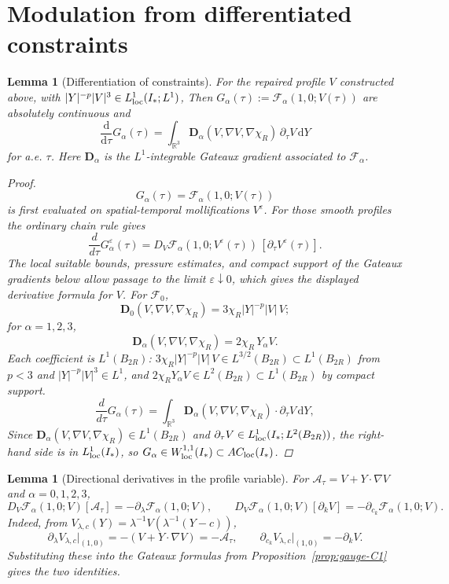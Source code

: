 \documentclass[11pt]{amsart}
\theoremstyle{plain}
\newtheorem{lemma}[theorem]{Lemma}
\theoremstyle{definition}
\theoremstyle{remark}
\newcommand{\dd}{\mathrm d}
\newcommand{\RR}{\mathbb R}
\newcommand{\nn}{\nabla}
\begin{document}
\section{Modulation from differentiated constraints}\label{sec:modulation}
\begin{lemma}[Differentiation of constraints]\label{lem:diff-f}
For the repaired profile \(V\) constructed above, with
\(|Y|^{-p}|V|^3\in L^1_{\rm loc}(I_*;L^1)\),
Then \(G_\alpha(\tau):=\mathcal F_\alpha(1,0;V(\tau))\) are absolutely
continuous and
\[
\frac{\dd}{\dd\tau}G_\alpha(\tau)
=\int_{\RR^3}\mathbf D_\alpha(V,\nn V,\nabla\chi_R)\,\partial_\tau V\,\dd Y
\]
for a.e. \(\tau\). Here \(\mathbf D_\alpha\) is the \(L^1\)-integrable Gateaux
gradient associated to \(\mathcal F_\alpha\).
\begin{proof}
\[
G_\alpha(\tau)=\mathcal F_\alpha(1,0;V(\tau))
\]
is first evaluated on spatial-temporal mollifications \(V^\varepsilon\).  For
those smooth profiles the ordinary chain rule gives
\[
\frac d{d\tau}G_\alpha^\varepsilon(\tau)
=D_V\mathcal F_\alpha(1,0;V^\varepsilon(\tau))\,[\partial_\tau V^\varepsilon(\tau)].
\]
The local suitable bounds, pressure estimates, and compact support of the
Gateaux gradients below allow passage to the limit \(\varepsilon\downarrow0\),
which gives the displayed derivative formula for \(V\).
For \(\mathcal F_0\),
\[
\mathbf D_0(V,\nabla V,\nabla\chi_R)
=3\chi_R|Y|^{-p}|V|\,V;
\]
for \(\alpha=1,2,3\),
\[
\mathbf D_\alpha(V,\nabla V,\nabla\chi_R)
=2\chi_R\,Y_\alpha V.
\]
Each coefficient is \(L^1(B_{2R})\): \(3\chi_R|Y|^{-p}|V|\,V\in
L^{3/2}(B_{2R})\subset L^1(B_{2R})\) from \(p<3\) and \(|Y|^{-p}|V|^3\in L^1\), and
\(2\chi_RY_\alpha V\in L^2(B_{2R})\subset L^1(B_{2R})\) by compact support.
\[
\frac d{d\tau}G_\alpha(\tau)
=\int_{\RR^3}\mathbf D_\alpha(V,\nn V,\nabla\chi_R)\cdot\partial_\tau V\,\dd Y,
    \]
Since \(\mathbf D_\alpha(V,\nn V,\nabla\chi_R)\in L^1(B_{2R})\) and
\(\partial_\tau V\in L^1_{\rm loc}(I_*;L^2(B_{2R}))\),
the right-hand side is in \(L^1_{\rm loc}(I_*)\), so \(G_\alpha\in W^{1,1}_{\rm loc}(I_*)\subset AC_{\rm loc}(I_*)\).
\end{proof}
\end{lemma}

\begin{lemma}[Directional derivatives in the profile variable]\label{lem:profile-direction}
For \(\mathcal A_\tau=V+Y\cdot\nn V\) and \(\alpha=0,1,2,3\),
\[
D_V\mathcal F_\alpha(1,0;V)[\mathcal A_\tau]
=-\partial_\lambda\mathcal F_\alpha(1,0;V),\qquad
D_V\mathcal F_\alpha(1,0;V)[\partial_kV]
=-\partial_{c_k}\mathcal F_\alpha(1,0;V).
\]
Indeed, from \(V_{\lambda,c}(Y)=\lambda^{-1}V(\lambda^{-1}(Y-c))\),
\[
\partial_\lambda V_{\lambda,c}\big|_{(1,0)}=-(V+Y\cdot\nabla V)=-\mathcal A_\tau,\qquad
\partial_{c_k}V_{\lambda,c}\big|_{(1,0)}=-\partial_kV.
\]
Substituting these into the Gateaux formulas from Proposition~\ref{prop:gauge-C1} gives the two identities.
\end{lemma}
\end{document}
